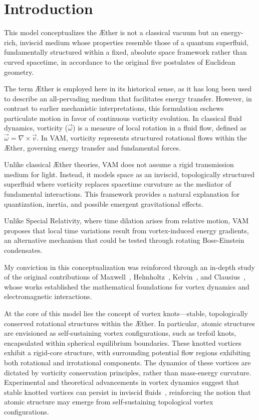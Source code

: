 
\section*{Introduction}
This model conceptualizes the Æther is not a classical vacuum but an energy-rich, inviscid medium whose properties resemble those of a quantum superfluid, fundamentally structured within a fixed, absolute space framework rather than curved spacetime, in accordance to the original five postulates of Euclidean geometry.


The term Æther is employed here in its historical sense, as it has long been used to describe an all-pervading medium that facilitates energy transfer.
However, in contrast to earlier mechanistic interpretations, this formulation eschews particulate motion in favor of continuous vorticity evolution. In classical fluid dynamics, vorticity ($\vec{\omega}$) is a measure of local rotation in a fluid flow, defined as $\vec{\omega} = \nabla \times \vec{v}$. In VAM, vorticity represents structured rotational flows within the Æther, governing energy transfer and fundamental forces.

Unlike classical Æther theories, VAM does not assume a rigid transmission medium for light. Instead, it models space as an inviscid, topologically structured superfluid where vorticity replaces spacetime curvature as the mediator of fundamental interactions. This framework provides a natural explanation for quantization, inertia, and possible emergent gravitational effects.

Unlike Special Relativity, where time dilation arises from relative motion, VAM proposes that local time variations result from vortex-induced energy gradients, an alternative mechanism that could be tested through rotating Bose-Einstein condensates.



My conviction in this conceptualization was reinforced through an in-depth study of the original contributions of Maxwell~\cite{maxwell1861}, Helmholtz~\cite{helmholtz1858}, Kelvin~\cite{kelvin1867}, and Clausius~\cite{clausius1865}, whose works established the mathematical foundations for vortex dynamics and electromagnetic interactions.

At the core of this model lies the concept of vortex knots—stable, topologically conserved rotational structures within the Æther.
In particular, atomic structures are envisioned as self-sustaining vortex configurations, such as trefoil knots, encapsulated within spherical equilibrium boundaries.
These knotted vortices exhibit a rigid-core structure, with surrounding potential flow regions exhibiting both rotational and irrotational components.
The dynamics of these vortices are dictated by vorticity conservation principles, rather than mass-energy curvature.
Experimental and theoretical advancements in vortex dynamics suggest that stable knotted vortices can persist in inviscid fluids~\cite{kleckner2013}, reinforcing the notion that atomic structure may emerge from self-sustaining topological vortex configurations.


